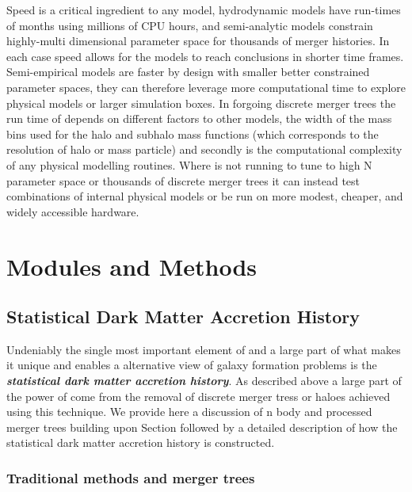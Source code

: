 Speed is a critical ingredient to any model, hydrodynamic models have run-times of months using millions of CPU hours, and semi-analytic models constrain highly-multi dimensional parameter space for thousands of merger histories. In each case speed allows for the models to reach conclusions in shorter time frames. Semi-empirical models are faster by design with smaller better constrained parameter spaces, they can therefore leverage more computational time to explore physical models or larger simulation boxes. In forgoing discrete merger trees the run time of \steel depends on different factors to other models, the width of the mass bins used for the halo and subhalo mass functions (which corresponds to the resolution of halo or mass particle) and secondly is the computational complexity of any physical modelling routines. Where \steel is not running to tune to high N parameter space or thousands of discrete merger trees it can instead test combinations of internal physical models or be run on more modest, cheaper, and widely accessible hardware.

\section{Modules and Methods}

\subsection{Statistical Dark Matter Accretion History}
\label{subsec:SDMAH}

Undeniably the single most important element of \steel and a large part of what makes it unique and enables a alternative view of galaxy formation problems is the \textbf{\textit{statistical dark matter accretion history}}. As described above a large part of the power of \steel come from the removal of discrete merger tress or haloes achieved using this technique. We provide here a discussion of n body and processed merger trees building upon Section \label{sec:LCDM} followed by a detailed description of how the statistical dark matter accretion history is constructed.

\subsubsection{Traditional methods and merger trees}


